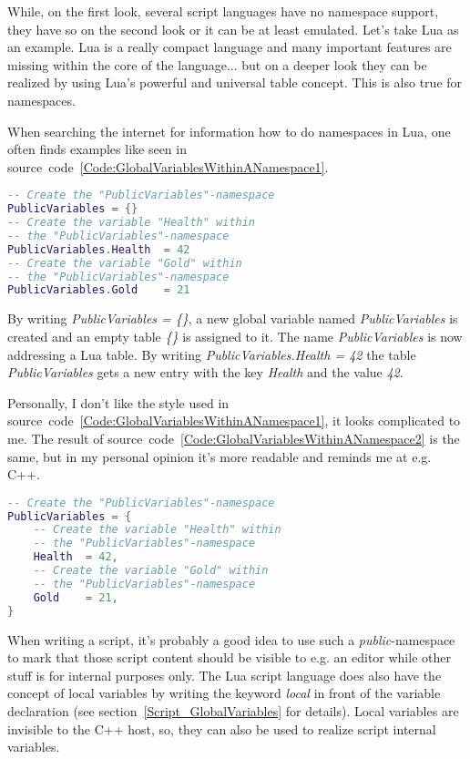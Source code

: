 While, on the first look, several script languages have no namespace support, they have so on the second look or it can be at least emulated. Let's take Lua as an example. Lua is a really compact language and many important features are missing within the core of the language... but on a deeper look they can be realized by using Lua's powerful and universal table concept. This is also true for namespaces.

When searching the internet for information how to do namespaces in Lua, one often finds examples like seen in source~code~\ref{Code:GlobalVariablesWithinANamespace1}.
\begin{lstlisting}[language=lua,float=htb,label=Code:GlobalVariablesWithinANamespace1,caption={Global variables within a namespace (1)}]
-- Create the "PublicVariables"-namespace
PublicVariables = {}
-- Create the variable "Health" within
-- the "PublicVariables"-namespace
PublicVariables.Health	= 42
-- Create the variable "Gold" within
-- the "PublicVariables"-namespace
PublicVariables.Gold	= 21
\end{lstlisting}
By writing \emph{PublicVariables = \{\}}, a new global variable named \emph{PublicVariables} is created and an empty table \emph{\{\}} is assigned to it. The name \emph{PublicVariables} is now addressing a Lua table. By writing \emph{PublicVariables.Health = 42} the table \emph{PublicVariables} gets a new entry with the key \emph{Health} and the value \emph{42}.

Personally, I don't like the style used in source~code~\ref{Code:GlobalVariablesWithinANamespace1}, it looks complicated to me. The result of source~code~\ref{Code:GlobalVariablesWithinANamespace2} is the same, but in my personal opinion it's more readable and reminds me at e.g. C++.
\begin{lstlisting}[language=lua,float=htb,label=Code:GlobalVariablesWithinANamespace2,caption={Global variables within a namespace (2)}]
-- Create the "PublicVariables"-namespace
PublicVariables = {
	-- Create the variable "Health" within
	-- the "PublicVariables"-namespace
	Health	= 42,
	-- Create the variable "Gold" within
	-- the "PublicVariables"-namespace
	Gold	= 21,
}
\end{lstlisting}

When writing a script, it's probably a good idea to use such a \emph{public}-namespace to mark that those script content should be visible to e.g. an editor while other stuff is for internal purposes only. The Lua script language does also have the concept of local variables by writing the keyword \emph{local} in front of the variable declaration (see section~\ref{Script_GlobalVariables} for details). Local variables are invisible to the C++ host, so, they can also be used to realize script internal variables.

